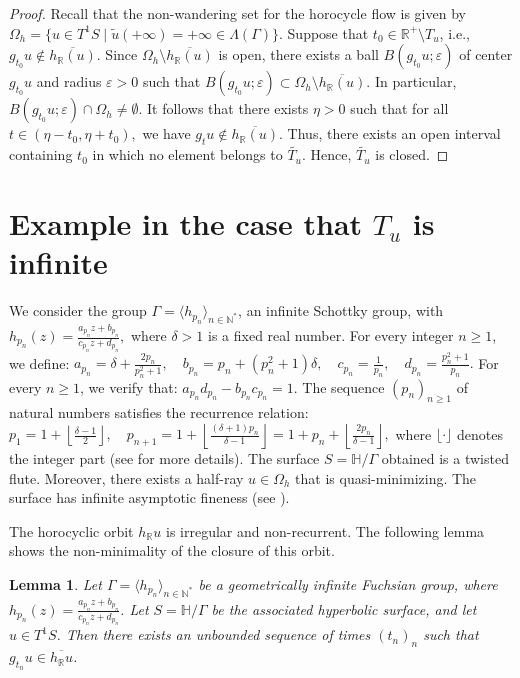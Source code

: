 \documentclass[11pt]{amsart}
\newtheorem{lem}{Lemma}[section]
\begin{document}
\begin{proof}
Recall that the non-wandering set for the horocycle flow is given by $\Omega_h = \{ u \in T^1 S \mid \tilde{u}(+\infty) = +\infty\in\Lambda(\Gamma) \}.
$ Suppose that $t_0 \in \mathbb{R}^+ \setminus T_u$, i.e.,$g_{t_0} u \notin \overline{h_{\mathbb{R}}(u)}.
$ Since $\Omega_h \setminus \overline{h_{\mathbb{R}}(u)}$ is open, there exists a ball \(B(g_{t_0} u; \varepsilon)\) of center $g_{t_0} u$ and radius $\varepsilon > 0$ such that $B(g_{t_0} u;\varepsilon) \subset \Omega_h \setminus \overline{h_{\mathbb{R}}(u)}.$ In particular, $B(g_{t_0} u; \varepsilon) \cap \Omega_h \neq \emptyset.$
It follows that there exists $\eta > 0$ such that for all $t \in (\eta - t_0, \eta + t_0),$ we have $g_t u \notin \overline{h_{\mathbb{R}}(u)}.$
Thus, there exists an open interval containing $t_0$ in which no element belongs to $\tilde{T_u}$. Hence, $\tilde{T_u}$ is closed.
\end{proof}

\section{Example in the case that $T_{u}$ is infinite}

We consider the group $\Gamma = \langle h_{p_n} \rangle_{n \in \mathbb{N}^*}$, an infinite Schottky group, with $h_{p_n}(z)=\frac{a_{p_n} z + b_{p_n}}{c_{p_n} z + d_{p_n}}, $ where $\delta>1$ is a fixed real number. For every integer $n \geq 1$, we define: $a_{p_n} = \delta+\frac{ 2p_n}{p_n^2 + 1}, \quad b_{p_n} = p_n + (p_n^2 + 1)\delta, \quad c_{p_n} = \frac{1}{p_n}, \quad d_{p_n} = \frac{p_n^2 + 1}{p_n}.$ For every $n \geq 1$, we verify that: $a_{p_n} d_{p_n} - b_{p_n} c_{p_n} = 1.$
The sequence $(p_n)_{n \geq 1}$ of natural numbers satisfies the recurrence relation:
$p_1 = 1 + \left\lfloor \frac{\delta - 1}{2} \right\rfloor, \quad
p_{n+1} = 1 + \left\lfloor \frac{(\delta + 1)p_n}{\delta - 1} \right\rfloor= 1 + p_n + \left\lfloor \frac{2p_n}{\delta - 1} \right\rfloor,$ where \( \lfloor \cdot \rfloor \) denotes the integer part (see \cite{SyGaye2025} for more details).
The surface $S = \mathbb{H}/\Gamma$ obtained is a twisted flute. Moreover, there exists a half-ray $u \in \Omega_h $ that is quasi-minimizing.
The surface has infinite asymptotic fineness (see \cite{SyGaye2025}).

The horocyclic orbit $h_{\mathbb{R}} u$ is irregular and non-recurrent. The following lemma shows the non-minimality of the closure of this orbit.

\begin{lem}
Let $\Gamma = \langle h_{p_n} \rangle_{n \in \mathbb{N}^{*}}$ be a geometrically infinite Fuchsian group, where $h_{p_n}(z) = \frac{a_{p_n}z + b_{p_n}}{c_{p_n}z + d_{p_n}}$. Let $S = \mathbb{H}/\Gamma$ be the associated hyperbolic surface, and let $u \in T^{1}S$. Then there exists an unbounded sequence of times $(t_n)_n$ such that $g_{t_n}u \in \overline{h_{\mathbb{R}}u}$.
\end{lem}
\end{document}
